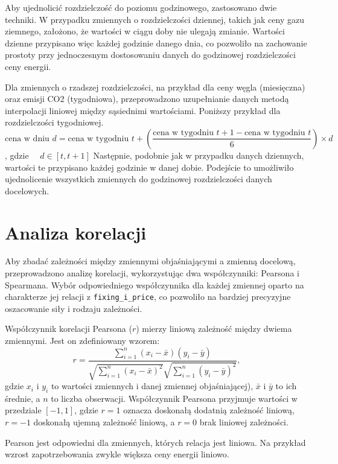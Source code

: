 Aby ujednolicić rozdzielczość do poziomu godzinowego, zastosowano dwie techniki. W przypadku zmiennych o rozdzielczości dziennej, takich jak ceny gazu ziemnego, założono, że wartości w ciągu doby nie ulegają zmianie. Wartości dzienne przypisano więc każdej godzinie danego dnia, co pozwoliło na zachowanie prostoty przy jednoczesnym dostosowaniu danych do godzinowej rozdzielczości ceny energii. 

Dla zmiennych o rzadszej rozdzielczości, na przykład dla ceny węgla (miesięczna) oraz emisji CO2 (tygodniowa), przeprowadzono uzupełnianie danych metodą interpolacji liniowej między sąsiednimi wartościami. Poniższy przykład dla rozdzielczości tygodniowej.
\[
\text{cena w dniu } d = \text{cena w tygodniu } t + \left( \frac{\text{cena w tygodniu } t+1 - \text{cena w tygodniu } t}{6} \right) \times d
\]
, gdzie \( \quad d \in [t, t+1] \) \newline
Następnie, podobnie jak w przypadku danych dziennych, wartości te przypisano każdej godzinie w danej dobie. Podejście to umożliwiło ujednolicenie wszystkich zmiennych do godzinowej rozdzielczości danych docelowych.

\section{Analiza korelacji}

Aby zbadać zależności między zmiennymi objaśniającymi a zmienną docelową, przeprowadzono analizę korelacji, wykorzystując dwa współczynniki: Pearsona i Spearmana. Wybór odpowiedniego współczynnika dla każdej zmiennej oparto na charakterze jej relacji z \texttt{fixing\_i\_price}, co pozwoliło na bardziej precyzyjne oszacowanie siły i rodzaju zależności.

Współczynnik korelacji Pearsona (\( r \)) mierzy liniową zależność między dwiema zmiennymi. Jest on zdefiniowany wzorem:
\[
r = \frac{\sum_{i=1}^{n} (x_i - \bar{x})(y_i - \bar{y})}{\sqrt{\sum_{i=1}^{n} (x_i - \bar{x})^2} \sqrt{\sum_{i=1}^{n} (y_i - \bar{y})^2}},
\]
gdzie \( x_i \) i \( y_i \) to wartości zmiennych i danej zmiennej objaśniającej), \( \bar{x} \) i \( \bar{y} \) to ich średnie, a \( n \) to liczba obserwacji. Współczynnik Pearsona przyjmuje wartości w przedziale \([-1, 1]\), gdzie \( r = 1 \) oznacza doskonałą dodatnią zależność liniową, \( r = -1 \) doskonałą ujemną zależność liniową, a \( r = 0 \) brak liniowej zależności.

Pearson jest odpowiedni dla zmiennych, których relacja jest liniowa. Na przykład wzrost zapotrzebowania zwykle większa ceny energii liniowo.

